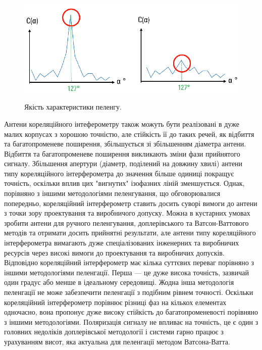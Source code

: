 \documentclass{article}
\begin{document}
\begin{figure}[H]
	\centering
	{\includegraphics[width=0.7\linewidth]{images/correletaion_interfer_graphs.png}}
	\caption{Якість характеристики пеленгу.}
\end{figure}

Антени кореляційного інтеферометру також можуть бути реалізовані в дуже малих корпусах з хорошою точністю, але стійкість її до таких речей, як відбиття та багатопроменеве поширення, збільшується зі збільшенням діаметра антени. Відбиття та багатопроменеве поширення викликають зміни фази прийнятого сигналу. Збільшення апертури (діаметр, поділений на довжину хвилі) антени типу кореляційного інтерферометра до значення більше одиниці покращує точність, оскільки вплив цих "вигнутих" ізофазних ліній зменшується. Однак, порівняно з іншими методологіями пеленгування, що обговорювалися попередньо, кореляційний інтерферометр ставить досить суворі вимоги до антени з точки зору проектування та виробничого допуску. Можна в кустарних умовах зробити антени для ручного пеленгування, доплерівського та Ватсон-Ваттового методів та отримати досить прийнятні результати, але антени типу кореляційного інтерферометра вимагають дуже спеціалізованих інженерних та виробничих ресурсів через високі вимоги до проектування та виробничих допусків. Відповідно кореляційний інтерферометр має кілька суттєвих переваг порівняно з іншими методологіями пеленгації. Перша — це дуже висока точність, зазвичай один градус або менше в ідеальному середовищі. Жодна інша методологія пеленгації не може забезпечити пеленгації з подібним рівнем точності. Оскільки кореляційний інтерферометр порівнює різниці фаз на кількох елементах одночасно, вона пропонує дуже високу стійкість до багатопроменевості порівняно з іншими методологіями. Поляризація сигналу не впливає на точність, це є один з головних недоліків доплерівської методології і системи гарно працює з урахуванням висот, яка актуальна для пеленгації методом Ватсона-Ватта. 

\end{document}
